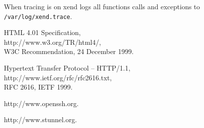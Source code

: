 \documentclass[11pt,twoside,final,openright]{xenstyle}
\begin{document}
When tracing is on xend logs all functions calls and exceptions to
{\tt /var/log/xend.trace}.

\begin{thebibliography}{99}

HTML 4.01 Specification,\\
http://www.w3.org/TR/html4/,\\
W3C Recommendation, 24 December 1999.

Hypertext Transfer Protocol -- HTTP/1.1,\\
http://www.ietf.org/rfc/rfc2616.txt,\\
RFC 2616, IETF 1999.

http://www.openssh.org.

http://www.stunnel.org.

\end{thebibliography}
\end{document}
